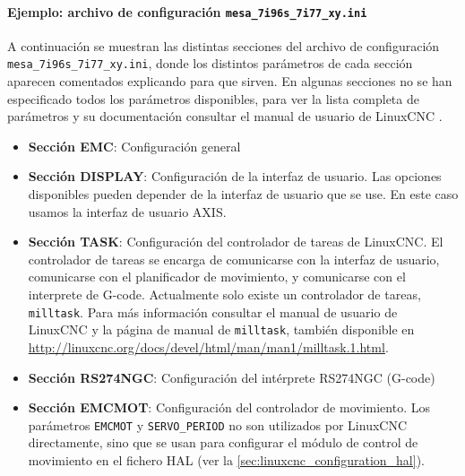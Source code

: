 \documentclass[english,spanish,a4paper,11pt]{article}
\begin{document}
\paragraph{Ejemplo: archivo de configuración \texttt{mesa\_7i96s\_7i77\_xy.ini}}\hfill\medskip

A continuación se muestran las distintas secciones del archivo de configuración \texttt{mesa\_7i96s\_7i77\_xy.ini}, donde los distintos parámetros de cada sección aparecen comentados explicando para que sirven. En algunas secciones no se han especificado todos los parámetros disponibles, para ver la lista completa de parámetros y su documentación consultar el manual de usuario de LinuxCNC \cite{
linuxcncdoc}.

\begin{itemize}
    \item \textbf{Sección EMC}: Configuración general

    \item \textbf{Sección DISPLAY}: Configuración de la interfaz de usuario. Las opciones disponibles pueden depender de la interfaz de usuario que se use. En este caso usamos la interfaz de usuario AXIS.

    \item \textbf{Sección TASK}: Configuración del controlador de tareas de LinuxCNC. El controlador de tareas se encarga de comunicarse con la interfaz de usuario, comunicarse con el planificador de movimiento, y
    comunicarse con el interprete de G-code. Actualmente solo existe un controlador de tareas, \texttt{milltask}. Para más información consultar el manual de usuario de LinuxCNC \cite{linuxcncdoc} y la página de manual de \texttt{milltask}, también disponible en \url{http://linuxcnc.org/docs/devel/html/man/man1/milltask.1.html}.

    \item \textbf{Sección RS274NGC}: Configuración del intérprete RS274NGC (G-code)

    \item \textbf{Sección EMCMOT}: Configuración del controlador de movimiento. Los parámetros \texttt{EMCMOT} y \texttt{SERVO\_PERIOD} no son utilizados por LinuxCNC directamente, sino que se usan para configurar el módulo de control de movimiento en el fichero HAL (ver la \cref{sec:linuxcnc_configuration_hal}).


\end{itemize}
\end{document}
